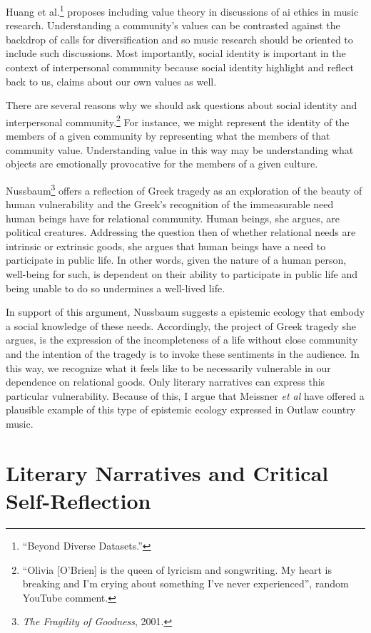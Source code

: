 \documentclass[phdthesis,12pt,final,a4paper]{wuthesis}
\theoremstyle{definition}
\theoremstyle{definition}
\theoremstyle{definition}
\theoremstyle{definition}
\theoremstyle{remark}
\begin{document}
Huang et al.\footnote{{``Beyond {Diverse Datasets}.''}} proposes including value theory in discussions of ai ethics in music research. Understanding a community's values can be contrasted against the backdrop of calls for diversification and so music research should be oriented to include such discussions. Most importantly, social identity is important in the context of interpersonal community because social identity highlight and reflect back to us, claims about our own values as well.

There are several reasons why we should ask questions about social identity and interpersonal community.\footnote{``Olivia {[}O'Brien{]} is the queen of lyricism and songwriting. My heart is breaking and I'm crying about something I've never experienced'', random YouTube comment.} For instance, we might represent the identity of the members of a given community by representing what the members of that community value. Understanding value in this way may be understanding what objects are emotionally provocative for the members of a given culture.

Nussbaum\footnote{\emph{The {Fragility} of {Goodness}}, 2001.} offers a reflection of Greek tragedy as an exploration of the beauty of human vulnerability and the Greek's recognition of the immeasurable need human beings have for relational community. Human beings, she argues, are political creatures. Addressing the question then of whether relational needs are intrinsic or extrinsic goods, she argues that human beings have a need to participate in public life. In other words, given the nature of a human person, well-being for such, is dependent on their ability to participate in public life and being unable to do so undermines a well-lived life.

In support of this argument, Nussbaum suggests a epistemic ecology that embody a social knowledge of these needs. Accordingly, the project of Greek tragedy she argues, is the expression of the incompleteness of a life without close community and the intention of the tragedy is to invoke these sentiments in the audience. In this way, we recognize what it feels like to be necessarily vulnerable in our dependence on relational goods. Only literary narratives can express this particular vulnerability. Because of this, I argue that Meissner \emph{et al} have offered a plausible example of this type of epistemic ecology expressed in Outlaw country music.

\section{Literary Narratives and Critical Self-Reflection}\label{literary-narratives-and-critical-self-reflection}
\end{document}
